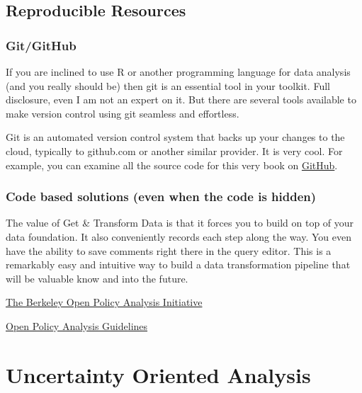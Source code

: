 \documentclass[
]{book}
\begin{document}
\hypertarget{reproducible-resources}{%
\section{Reproducible Resources}\label{reproducible-resources}}

\hypertarget{gitgithub}{%
\subsection{Git/GitHub}\label{gitgithub}}

If you are inclined to use R or another programming language for data analysis (and you really should be) then git is an essential tool in your toolkit. Full disclosure, even I am not an expert on it. But there are several tools available to make version control using git seamless and effortless.

Git is an automated version control system that backs up your changes to the cloud, typically to github.com or another similar provider. It is very cool. For example, you can examine all the source code for this very book on \href{https://github.com/nemethc/dataisfordemocracy/tree/master/doingdemocraticdataanalysis}{GitHub}.

\hypertarget{code-based-solutions-even-when-the-code-is-hidden}{%
\subsection{Code based solutions (even when the code is hidden)}\label{code-based-solutions-even-when-the-code-is-hidden}}

The value of Get \& Transform Data is that it forces you to build on top of your data foundation. It also conveniently records each step along the way. You even have the ability to save comments right there in the query editor. This is a remarkably easy and intuitive way to build a data transformation pipeline that will be valuable know and into the future.

\href{https://www.bitss.org/opa/}{The Berkeley Open Policy Analysis Initiative}

\href{https://www.bitss.org/wp-content/uploads/2019/03/OPA-Guidelines.pdf}{Open Policy Analysis Guidelines}

\hypertarget{uncertainty-oriented-analysis}{%
\chapter{Uncertainty Oriented Analysis}\label{uncertainty-oriented-analysis}}
\end{document}
